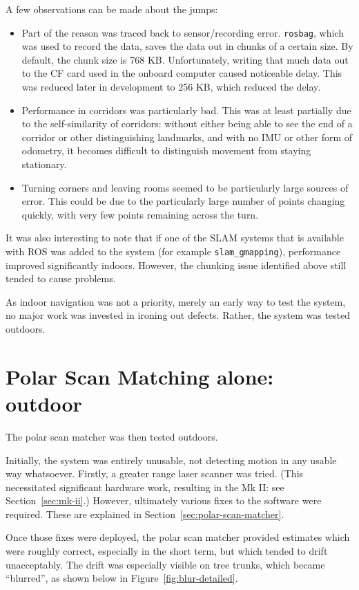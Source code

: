 \documentclass[12pt,oneside,a4paper]{book}
\begin{document}
A few observations can be made about the jumps:
\begin{itemize}
\item Part of the reason was traced back to sensor/recording
  error. \texttt{rosbag}, which was used to record the data, saves the
  data out in chunks of a certain size. By default, the chunk size is
  768 KB. Unfortunately, writing that much data out to the CF card
  used in the onboard computer caused noticeable delay. This was
  reduced later in development to 256 KB, which reduced the delay.
\item Performance in corridors was particularly bad. This was at least
  partially due to the self-similarity of corridors: without either
  being able to see the end of a corridor or other distinguishing
  landmarks, and with no IMU or other form of odometry, it becomes
  difficult to distinguish movement from staying stationary.
\item Turning corners and leaving rooms seemed to be particularly
  large sources of error. This could be due to the particularly large
  number of points changing quickly, with very few points remaining
  across the turn.
\end{itemize}

It was also interesting to note that if one of the SLAM systems that
is available with ROS was added to the system (for example
\texttt{slam\_gmapping}), performance improved significantly
indoors. However, the chunking issue identified above still tended to
cause problems.

As indoor navigation was not a priority, merely an early way to test
the system, no major work was invested in ironing out defects. Rather,
the system was tested outdoors.

\section{Polar Scan Matching alone: outdoor}
\label{sec:psm-outdoor}

The polar scan matcher was then tested outdoors.

Initially, the system was entirely unusable, not detecting motion in
any usable way whatsoever. Firstly, a greater range laser scanner was
tried. (This necessitated significant hardware work, resulting in the
Mk II: see Section~\ref{sec:mk-ii}.) However, ultimately various fixes
to the software were required. These are explained in
Section~\ref{sec:polar-scan-matcher}.

Once those fixes were deployed, the polar scan matcher provided
estimates which were roughly correct, especially in the short term,
but which tended to drift unacceptably. The drift was especially
visible on tree trunks, which became ``blurred'', as shown below in
Figure~\ref{fig:blur-detailed}. 
\end{document}
